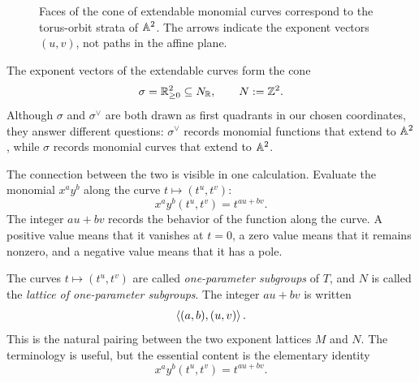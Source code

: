 \begin{figure}[ht]
\centering
{}
\caption{Faces of the cone of extendable monomial curves correspond to
the torus-orbit strata of \(\mathbb{A}^2\). The arrows indicate the exponent
vectors \((u,v)\), not paths in the affine plane.}
\label{fig:a2-limit-cone}
\end{figure}

The exponent vectors of the extendable curves form the cone
\[
\sigma=\mathbb{R}_{\geq0}^2\subseteq N_{\mathbb{R}},
\qquad
N:=\mathbb{Z}^2.
\]
Although \(\sigma\) and \(\sigma^\vee\) are both drawn as first
quadrants in our chosen coordinates, they answer different questions:
\(\sigma^\vee\) records monomial functions that extend to
\(\mathbb{A}^2\), while \(\sigma\) records monomial curves that extend to
\(\mathbb{A}^2\).

The connection between the two is visible in one calculation. Evaluate
the monomial \(x^ay^b\) along the curve \(t\mapsto(t^u,t^v)\):
\[
x^ay^b(t^u,t^v)=t^{au+bv}.
\]
The integer \(au+bv\) records the behavior of the function along the
curve. A positive value means that it vanishes at \(t=0\), a zero
value means that it remains nonzero, and a negative value means that
it has a pole.

\begin{observation}
The curves \(t\mapsto(t^u,t^v)\) are called
\emph{one-parameter subgroups} of \(T\), and \(N\) is called the
\emph{lattice of one-parameter subgroups}. The integer \(au+bv\) is
written
\[
\left\langle (a,b),(u,v)\right\rangle.
\]
This is the natural pairing between the two exponent lattices \(M\)
and \(N\). The terminology is useful, but the essential content is
the elementary identity
\[
x^ay^b(t^u,t^v)=t^{au+bv}.
\]
\end{observation}


